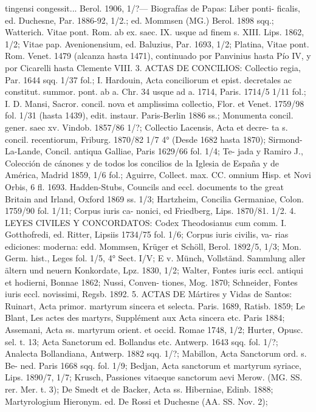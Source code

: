 \raggedbottom{} \documentclass[12pt]{book}
\begin{document}
tingensi congessit... Berol. 1906, 1/?— Biografías de Papas: Liber ponti-
ficalis, ed. Duchesne, Par. 1886-92, 1/2.; ed. Mommsen (MG.) Berol. 1898
sqq.; Watterich. Vitae pont. Rom. ab ex. saec. IX. usque ad finem s. XIII.
Lips. 1862, 1/2; Vitae pap. Avenionensium, ed. Baluzius, Par. 1693, 1/2;
Platina, Vitae pont. Rom. Venet. 1479 (alcanza hasta 1471), continuado por
Panvinius hasta Pío IV, y por Cicarelli hasta Clemente VIII.
3. ACTAS DE CONCILIOS: Collectio regia, Par. 1644 sqq. 1/37 fol.;
I. Hardouin, Acta conciliorum et epist. decretales ac constitut. summor.
pont. ab a. Chr. 34 usque ad a. 1714, Paris. 1714/5 1/11 fol.; I. D. Mansi,
Sacror. concil. nova et amplissima collectio, Flor. et Venet. 1759/98 fol.
1/31 (hasta 1439), edit. instaur. Paris-Berlin 1886 ss.; Monumenta concil.
gener. saec xv. Vindob. 1857/86 1/?; Collectio Lacensis, Acta et decre-
ta s. concil. recentiorum, Friburg. 1870/82 1/7 4° (Desde 1682 hasta 1870);
Sirmond-La-Lande, Concil. antiqua Galliae, Paris 1629/66 fol. 1/4; Te-
jada y Ramiro J., Colección de cánones y de todos los concilios de la
Iglesia de España y de América, Madrid 1859, 1/6 fol.; Aguirre, Collect.
max. CC. omnium Hisp. et Novi Orbis, 6 fl. 1693. Hadden-Stubs, Councils
and eccl. documents to the great Britain and Irland, Oxford 1869 ss. 1/3;
Hartzheim, Concilia Germaniae, Colon. 1759/90 fol. 1/11; Corpus iuris ca-
nonici, ed Friedberg, Lips. 1870/81. 1/2.
4. LEYES CIVILES Y CONCORDATOS: Codex Theodosianus cum comm.
I. Gotthofredi, ed. Ritter, Lipsiis 1734/75 fol. 1/6; Corpus iuris civilis, va-
rias ediciones: moderna: edd. Mommsen, Krüger et Schöll, Berol.
1892/5, 1/3; Mon. Germ. hist., Leges fol. 1/5, 4° Sect. I/V; E v. Münch,
Vollständ. Sammlung aller ältern und neuern Konkordate, Lpz. 1830, 1/2;
Walter, Fontes iuris eccl. antiqui et hodierni, Bonnae 1862; Nussi, Conven-
tiones, Mog. 1870; Schneider, Fontes iuris eccl. novissimi, Regsb. 1892.
5. ACTAS DE Mártires y Vidas de Santos: Ruinart, Acta primor.
martyrum sincera et selecta. Paris. 1689, Ratisb. 1859; Le Blant, Les actes
des martyrs, Supplément aux Acta sincera etc. Paris 1884; Assemani, Acta
ss. martyrum orient. et occid. Romae 1748, 1/2; Hurter, Opusc. sel. t. 13;
Acta Sanctorum ed. Bollandus etc. Antwerp. 1643 sqq. fol. 1/?; Analecta
Bollandiana, Antwerp. 1882 sqq. 1/?; Mabillon, Acta Sanctorum ord. s. Be-
ned. Paris 1668 sqq. fol. 1/9; Bedjan, Acta sanctorum et martyrum syriace,
Lips. 1890/7, 1/7; Krusch, Passiones vitaeque sanctorum aevi Merow. (MG.
SS. rer. Mer. t. 3); De Smedt et de Backer, Acta ss. Hiberniae, Edinb.
1888; Martyrologium Hieronym. ed. De Rossi et Duchesne (AA. SS. Nov. 2);
\end{document}
